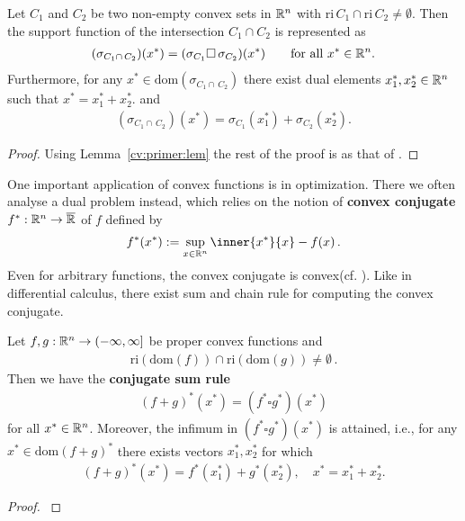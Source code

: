 \begin{theorem*}
  Let $C_1$ and $C_2$ be two non-empty convex sets in $\mathbb{R}^n$ with
  $\mathrm{ri}\,C_1\cap\mathrm{ri}\,C_2\neq\emptyset.$
  Then the support function of the intersection 
  $
    C_1\! \cap C_2
  $
  is represented as
  \begin{gather}
    (\sigma_{
    C_1 \cap\, C_2
    })
    (x^*)
    =
    (\sigma_{C_1}\square \,\sigma_{C_2})
    (x^*)
    \qquad
    \text{for all}\ 
    x^* \in \R^n.
  \end{gather}
  Furthermore, for any
  $
  x^*\in \mathrm{dom}
    (\sigma_{
    C_1 \cap\, C_2
    })
  $
  there exist dual elements 
  $
    x_1^*
    ,
    x_2^*
    \in \mathbb{R}^n
  $ 
  such that 
  $
    x^*
    =
    x_1^*
    +
    x_2^*.
  $
  and
  \begin{gather}
    (\sigma_{
    C_1 \cap\, C_2
    })
    (x^*)
    =
    \sigma_{C_1}(x_1^*)
    +
    \sigma_{C_2}(x_2^*).
  \end{gather}
\end{theorem*}
\begin{proof}
  Using Lemma~\ref{cv:primer:lem}
  the rest of the proof is as that of
  \emph{\cite[Theorem~4.23(b)]{Mordukhovich2022}}.
\end{proof}
One important application of convex functions is in optimization.
There we often analyse a dual problem instead, which relies on the notion of \textbf{convex conjugate} 
\index{$f^*$, convex conjugate of $f$}
$
    f^*:
    \mathbb{R}^n \to \overline{\mathbb{R}}
  $
  of $f$ defined by
  \begin{gather}
    \label{def:convex_conjugate}
    f^*(x^*)
    :=
    \sup_{ x \in \R^n }
    \inner
    {x^*}{x}
    - f(x)
    \,.
  \end{gather}
  Even for arbitrary functions, the convex conjugate is convex(cf.
  \cite[Proposition~4.2]{Mordukhovich2022}
  ).
  Like in differential calculus, there exist sum and chain rule for computing the convex conjugate.
\begin{theorem}
  Let
  $
    f,g:
    \mathbb{R}^n \to (-\infty, \infty]
  $
  be proper convex functions 
  and
  \begin{align*}
  \text{ri}\left( \text{dom}(f) \right)
  \cap
  \text{ri}\left( \text{dom}(g) \right)
  \neq 
  \emptyset
  \,.
  \end{align*}
  Then we have the 
  \textbf{
  conjugate sum rule
  }
  \begin{gather}
    ( f + g )^*(x^*)
    =
    ( f^* \square g^*)(x^*)
  \end{gather}
  for all $x^* \in \mathbb{R}^n$.
  Moreover, the infimum in 
  $
    ( f^* \square g^*)(x^*)
  $
  is attained, i.e., for any
  $
    x^* \in \text{dom}(f+g)^*
  $
  there exists vectors $x_1^*, x_2^*$
  for which
  \begin{gather}
    (f+g)^*(x^*)
    =
    f^*(x_1^*)
    +
    g^*(x_2^*),
    \quad
    x^* = x_1^* + x_2^*.
  \end{gather}
\end{theorem}
\begin{proof}
  \cite[Theorem~4.27(c)]{Mordukhovich2022}
\end{proof}



